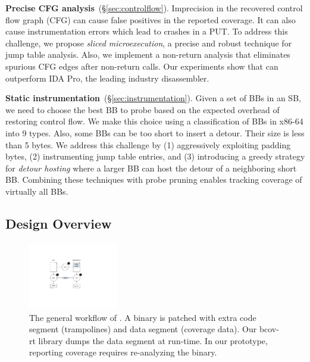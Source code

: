 \textbf{Precise CFG analysis}~(\S\ref{sec:controlflow}). 
Imprecision in the recovered control flow graph (CFG) can cause false positives in the reported coverage. 
It can also cause instrumentation errors which lead to crashes in a PUT.
To address this challenge, we propose \textit{sliced microexecution}, a precise and robust technique for jump table analysis. 
Also, we implement a non-return analysis that eliminates spurious CFG edges after non-return calls.
Our experiments show that {\bcov} can outperform IDA Pro, the leading industry disassembler.

\textbf{Static instrumentation}~(\S\ref{sec:instrumentation}). 
Given a set of BBs in an SB, we need to choose the best BB to probe based on the expected overhead of restoring control flow. 
We make this choice using a classification of BBs in \mbox{x86-64} into 9 types.
Also, some BBs can be too short to insert a detour. Their size is less than 5 bytes. 
We address this challenge by (1) aggressively exploiting padding bytes, (2) instrumenting jump table entries, and (3) introducing a greedy strategy for \textit{detour hosting} where a larger BB can host the detour of a neighboring short BB.
Combining these techniques with probe pruning enables tracking coverage of virtually all BBs.

\subsection{Design Overview}

\begin{figure}[t!]
    \centering
    \includegraphics[clip, trim=5cm 5.8cm 10cm 4.8cm, width=0.35\textwidth]{fig/bcov-01-work-flow}
    \caption[workflow]{The general workflow of {\bcov}. 
        A binary is patched with extra code segment (trampolines) and data segment (coverage data). 
        Our \mbox{\textsf{bcov-rt}} library dumps the data segment at run-time. 
        In our prototype, reporting coverage requires re-analyzing the binary.}
    \label{fig:bcov-work-flow}
\end{figure}

